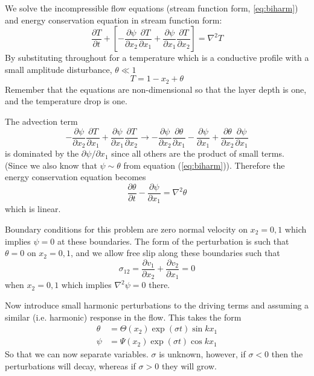 \documentclass[10pt]{article}
\begin{document}
		We solve the incompressible flow equations (stream function form, \ref{eq:biharm}) and 
		energy conservation equation in stream function form:
			\begin{equation}
				\frac{\partial T}{\partial t} +
				 \left[ 	-\frac{\partial \psi}{\partial x_2}\frac{\partial T}{\partial x_1}
				 			+\frac	{\partial \psi}{\partial x_1}\frac{\partial T}{\partial x_2} \right]
				 		= \nabla^2 T
			\end{equation}
		By substituting throughout for a temperature which is a conductive 
		profile with a small amplitude disturbance, $\theta \ll 1$
			\begin{equation}
				T = 1- x_2 + \theta 
			\end{equation}		
		Remember that the equations are non-dimensional so that the layer depth
		is one, and the temperature drop is one.
		
		The advection term
			\begin{equation}
					-\frac{\partial \psi}{\partial x_2}\frac{\partial T}{\partial x_1}
				 			+\frac	{\partial \psi}{\partial x_1}\frac{\partial T}{\partial x_2} \rightarrow
				 	-\frac{\partial \psi}{\partial x_2}\frac{\partial \theta}{\partial x_1} -\frac{\partial \psi}{\partial x_1}
				 	+\frac	{\partial \theta}{\partial x_2}\frac{\partial \psi}{\partial x_1}
			\end{equation}
		is dominated by the $\partial \psi / \partial x_1$ since all 
		others are the product of small terms. (Since we also
		know that $\psi \sim \theta$ from equation (\ref{eq:biharm})). Therefore the 
		energy conservation equation becomes
			\begin{equation}
				\frac{\partial \theta}{\partial t} - \frac{\partial \psi}{\partial x_1} = \nabla^2 \theta
			\end{equation}
		which is linear.
		
		Boundary conditions for this problem are zero normal velocity on $x_2 = 0,1$ which implies
		$\psi=0$ at these boundaries. The form of the perturbation is such that $\theta =0$ on $x_2 = 0,1$,
		and we allow free slip along these boundaries such that
			\begin{equation}
				\sigma_{12} = \frac{\partial v_1}{\partial x_2} + \frac{\partial v_2}{\partial x_1} =0
			\end{equation}
		when $x_2 = 0,1$ which implies $\nabla^2 \psi =0$ there.
		
		Now introduce small harmonic perturbations to the driving terms and 
		assuming a similar (i.e. harmonic) response in the flow. This takes the form
			\begin{equation}
				\begin{split}
					\theta &= \Theta(x_2) \exp(\sigma t) \sin kx_1 \\
					\psi &= \Psi(x_2) \exp(\sigma t) \cos kx_1
				\end{split}
			\end{equation}
		So that we can now separate variables. $\sigma$ is unknown, however, if $\sigma < 0$ then
		the perturbations will decay, whereas if $\sigma > 0$ they will grow. 
		
\end{document}
